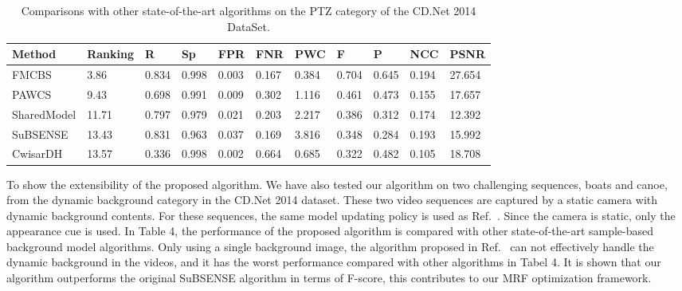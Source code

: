  \begin{table}[ht]
\caption{Comparisons with other state-of-the-art algorithms on the PTZ category of the CD.Net 2014 DataSet\cite{CD2014}.}
\label{tab:Comparisons on PTZ }
\begin{center}
\begin{tabular}{|l|l|l|l|l|l|l|l|l|l|l|} %
\hline
\rule[-1ex]{0pt}{3.5ex}  Method & Ranking & R &Sp & FPR & FNR &PWC &F &P & NCC & PSNR \\
\hline
\rule[-1ex]{0pt}{3.5ex}  FMCBS & 3.86 & 0.834 & 0.998 & 0.003 & 0.167 &0.384&0.704&0.645 &0.194&27.654\\
\hline
\rule[-1ex]{0pt}{3.5ex}  PAWCS\cite{Stcharles2015A}&9.43&0.698&0.991&0.009&0.302&1.116&0.461&0.473&0.155&17.657 \\
\hline
\rule[-1ex]{0pt}{3.5ex}  SharedModel\cite{Chen2015Learning}&  11.71&0.797&0.979&0.021&0.203&2.217&0.386&0.312&0.174&12.392  \\
\hline
\rule[-1ex]{0pt}{3.5ex}  SuBSENSE\cite{subsenseTIP}&  13.43&0.831&0.963&0.037&0.169&3.816&0.348&0.284&0.193&15.992 \\
\hline
\rule[-1ex]{0pt}{3.5ex}  CwisarDH\cite{Gregorio2014Change}&13.57&0.336&0.998&0.002&0.664&0.685&0.322&0.482&0.105&18.708  \\
\hline
\end{tabular}
\end{center}
\end{table}


To show the extensibility of the proposed algorithm. We have also tested our algorithm on two challenging sequences, boats and canoe, from the dynamic background category in the CD.Net 2014 dataset. These two video sequences are captured by a static camera with dynamic background contents. For these sequences, the same model updating policy is used as Ref.~. Since the camera is static, only the appearance cue is used. In Table 4, the performance of the proposed algorithm is compared with other state-of-the-art sample-based background model algorithms. Only using a single background image, the algorithm proposed in Ref.~\cite{Chien2002Efficient} can not effectively handle the dynamic background in the videos, and it has the worst performance compared with other algorithms in Tabel 4. It is shown that our algorithm outperforms the original SuBSENSE algorithm \cite{subsenseTIP} in terms of F-score, this contributes to our MRF optimization framework.

